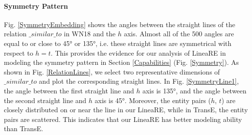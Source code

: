 \documentclass[conference]{IEEEtran}
\begin{document}
\paragraph{Symmetry Pattern}
Fig. \ref{SymmetryEmbedding} shows the angles between the straight lines of the relation $\_similar\_to$ in WN18 and the $h$ axis. Almost all of the 500 angles are equal to or close to 45° or 135°, i.e. these straight lines are symmetrical with respect to $h=t$. This provides the evidence for our analysis of LineaRE in modeling the symmetry pattern in Section \ref{Capabilities} (Fig. \ref{Symmetry}).
As shown in Fig. \ref{RelationLines}, we select two representative dimensions of $\_similar\_to$ and plot the corresponding straight lines. In Fig. \ref{SymmetryLine1}, the angle between the first straight line and $h$ axis is 135°, and the angle between the second straight line and $h$ axis is 45°. Moreover, the entity pairs ($h$, $t$) are closely distributed on or near the line in our LineaRE, while in TransE, the entity pairs are scattered. This indicates that our LineaRE has better modeling ability than TransE.
\begin{figure*}[t]
	\centering
	\caption{
		Visualization of the straight lines of $\_similar\_to$ and the entity pairs having the relation of $\_similar\_to$.
	}
	\label{RelationLines}
\end{figure*}
\end{document}

